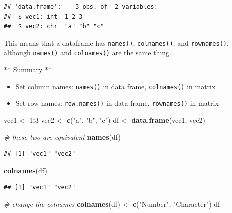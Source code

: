 \documentclass[
]{book}
\newenvironment{Shaded}{\begin{snugshade}}{\end{snugshade}}
\newcommand{\CommentTok}[1]{\textcolor[rgb]{0.56,0.35,0.01}{\textit{#1}}}
\newcommand{\DecValTok}[1]{\textcolor[rgb]{0.00,0.00,0.81}{#1}}
\newcommand{\FunctionTok}[1]{\textcolor[rgb]{0.13,0.29,0.53}{\textbf{#1}}}
\newcommand{\NormalTok}[1]{#1}
\newcommand{\OtherTok}[1]{\textcolor[rgb]{0.56,0.35,0.01}{#1}}
\newcommand{\SpecialCharTok}[1]{\textcolor[rgb]{0.81,0.36,0.00}{\textbf{#1}}}
\newcommand{\StringTok}[1]{\textcolor[rgb]{0.31,0.60,0.02}{#1}}
\providecommand{\tightlist}{%
  \setlength{\itemsep}{0pt}\setlength{\parskip}{0pt}}
\begin{document}
\begin{verbatim}
## 'data.frame':    3 obs. of  2 variables:
##  $ vec1: int  1 2 3
##  $ vec2: chr  "a" "b" "c"
\end{verbatim}

This means that a dataframe has \texttt{names()}, \texttt{colnames()}, and \texttt{rownames()}, although \texttt{names()} and \texttt{colnames()} are the same thing.

** Summary **

\begin{itemize}
\tightlist
\item
  Set column names: \texttt{names()} in data frame, \texttt{colnames()} in matrix
\item
  Set row names: \texttt{row.names()} in data frame, \texttt{rownames()} in matrix
\end{itemize}

\begin{Shaded}
\begin{Highlighting}[]
\NormalTok{vec1 }\OtherTok{\textless{}{-}} \DecValTok{1}\SpecialCharTok{:}\DecValTok{3}
\NormalTok{vec2 }\OtherTok{\textless{}{-}} \FunctionTok{c}\NormalTok{(}\StringTok{"a"}\NormalTok{, }\StringTok{"b"}\NormalTok{, }\StringTok{"c"}\NormalTok{)}
\NormalTok{df }\OtherTok{\textless{}{-}} \FunctionTok{data.frame}\NormalTok{(vec1, vec2)}

\CommentTok{\# these two are equivalent}
\FunctionTok{names}\NormalTok{(df)}
\end{Highlighting}
\end{Shaded}

\begin{verbatim}
## [1] "vec1" "vec2"
\end{verbatim}

\begin{Shaded}
\begin{Highlighting}[]
\FunctionTok{colnames}\NormalTok{(df)}
\end{Highlighting}
\end{Shaded}

\begin{verbatim}
## [1] "vec1" "vec2"
\end{verbatim}

\begin{Shaded}
\begin{Highlighting}[]
\CommentTok{\# change the colnames}
\FunctionTok{colnames}\NormalTok{(df) }\OtherTok{\textless{}{-}} \FunctionTok{c}\NormalTok{(}\StringTok{"Number"}\NormalTok{, }\StringTok{"Character"}\NormalTok{)}
\NormalTok{df}
\end{Highlighting}
\end{Shaded}
\end{document}
